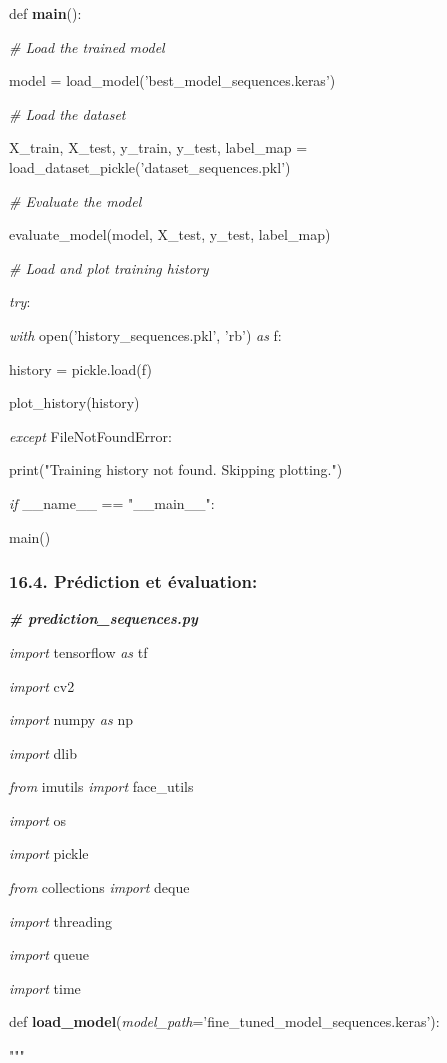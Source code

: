 \documentclass[
]{article}
\begin{document}
def \textbf{main}():

\emph{\# Load the trained model}

model = load\_model('best\_model\_sequences.keras')

\emph{\# Load the dataset}

X\_train, X\_test, y\_train, y\_test, label\_map = load\_dataset\_pickle('dataset\_sequences.pkl')

\emph{\# Evaluate the model}

evaluate\_model(model, X\_test, y\_test, label\_map)

\emph{\# Load and plot training history}

\emph{try}:

\emph{with} open('history\_sequences.pkl', 'rb') \emph{as} f:

history = pickle.load(f)

plot\_history(history)

\emph{except} FileNotFoundError:

print("Training history not found. Skipping plotting.")

\emph{if} \_\_name\_\_ == "\_\_main\_\_":

main()

\hypertarget{pruxe9diction-et-uxe9valuation}{%
\subsubsection{16.4. Prédiction et évaluation:}\label{pruxe9diction-et-uxe9valuation}}

\emph{\textbf{\# prediction\_sequences.py}}

\emph{import} tensorflow \emph{as} tf

\emph{import} cv2

\emph{import} numpy \emph{as} np

\emph{import} dlib

\emph{from} imutils \emph{import} face\_utils

\emph{import} os

\emph{import} pickle

\emph{from} collections \emph{import} deque

\emph{import} threading

\emph{import} queue

\emph{import} time

def \textbf{load\_model}(\emph{model\_path}='fine\_tuned\_model\_sequences.keras'):

"""
\end{document}
